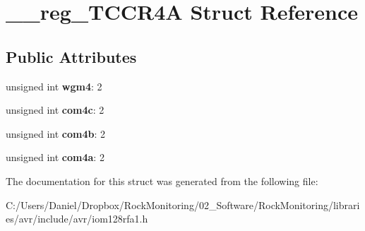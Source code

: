 \hypertarget{struct____reg___t_c_c_r4_a}{}\section{\+\_\+\+\_\+reg\+\_\+\+T\+C\+C\+R4A Struct Reference}
\label{struct____reg___t_c_c_r4_a}
\subsection*{Public Attributes}
\begin{DoxyCompactItemize}
\item 
unsigned int {\bfseries wgm4}\+: 2\hypertarget{struct____reg___t_c_c_r4_a_a9c9baa936aa6bafc54b9a20454185db5}{}\label{struct____reg___t_c_c_r4_a_a9c9baa936aa6bafc54b9a20454185db5}

\item 
unsigned int {\bfseries com4c}\+: 2\hypertarget{struct____reg___t_c_c_r4_a_a23d5e1b5cf422e9fe9e245014ee0d5a5}{}\label{struct____reg___t_c_c_r4_a_a23d5e1b5cf422e9fe9e245014ee0d5a5}

\item 
unsigned int {\bfseries com4b}\+: 2\hypertarget{struct____reg___t_c_c_r4_a_a0a85285a8ddcc0adc43f9d59471620e6}{}\label{struct____reg___t_c_c_r4_a_a0a85285a8ddcc0adc43f9d59471620e6}

\item 
unsigned int {\bfseries com4a}\+: 2\hypertarget{struct____reg___t_c_c_r4_a_aa88ffff662f2c39ea892f8c84bd69c7c}{}\label{struct____reg___t_c_c_r4_a_aa88ffff662f2c39ea892f8c84bd69c7c}

\end{DoxyCompactItemize}


The documentation for this struct was generated from the following file\+:\begin{DoxyCompactItemize}
\item 
C\+:/\+Users/\+Daniel/\+Dropbox/\+Rock\+Monitoring/02\+\_\+\+Software/\+Rock\+Monitoring/libraries/avr/include/avr/iom128rfa1.\+h\end{DoxyCompactItemize}

